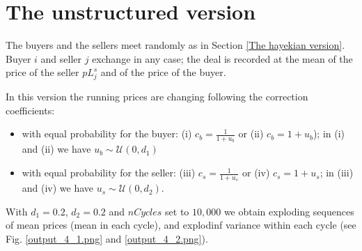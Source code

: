 \documentclass[12pt]{report}
\begin{document}
\section{The unstructured version}\label{The unstructured version}

The buyers and the sellers meet randomly as in Section \ref{The hayekian version}. Buyer $i$ and seller $j$ exchange in any case; the deal is recorded at the mean of the price of the seller $pL^s_j$ and of the price of the buyer.

In this version the running prices are changing following the correction coefficients:

\begin{itemize}

\item with equal probability for the buyer: (i) $c_b=\frac{1} {1 + u_b}$ or (ii) $c_b=1 + u_b$); in (i) and (ii) we have $u_b\sim\mathcal{U}(0,d_1)$

\item  with equal probability for the seller: (iii) $c_s=\frac{1} {1 + u_s}$ or (iv) $c_s=1 + u_s$; in (iii) and (iv) we have $u_s\sim\mathcal{U}(0,d_2)$.
\end{itemize}

With $d_1=0.2$, $d_2=0.2$ and $nCycles$ set to $10,000$ we obtain exploding sequences of mean prices (mean in each cycle), and explodinf variance within each cycle (see Fig. \ref{output_4_1.png} and \ref{output_4_2.png}).
\end{document}
